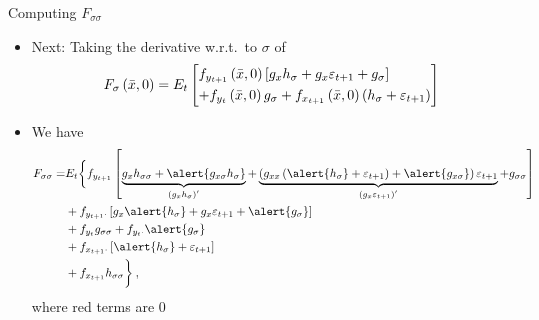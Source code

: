 \begin{frame}{Computing $F_{\sigma\sigma}$}
  \begin{itemize}
    \item Next: Taking the derivative  w.r.t.\ to $\sigma$ of
          \[{F_\sigma }\left( {\bar x,0} \right) = {E_t}\left[ \begin{gathered}
                {f_{{y_{t + 1}}}}\left( {\bar x,0} \right)\left[ {{g_x}{h_\sigma } + {g_x}{\varepsilon _{t + 1}} + {g_\sigma }} \right] \hfill \\
                + {f_{{y_t}}}\left( {\bar x,0} \right){g_\sigma } + {f_{{x_{t + 1}}}}\left( {\bar x,0} \right)\left( {{h_\sigma } + {\varepsilon _{t + 1}}} \right) \hfill \\
              \end{gathered}  \right]\]
    \item We have
          \begin{align}
            {F_{\sigma \sigma }} = & {E_t}\biggl\{ {f_{{y_{t + 1}}}}\left[ {\underbrace { {g_x}{h_{\sigma \sigma }} + \alert{{g_{x\sigma }}{h_\sigma }} }_{\left( {{g_x}{h_\sigma }} \right)'} + \underbrace { {\left( {{g_{xx}}\left( {\alert{h_\sigma } + {\varepsilon _{t + 1}}} \right) + \alert{g_{x\sigma }}} \right){\varepsilon _{t + 1}}} }_{\left( {{g_x}{\varepsilon _{t + 1}}} \right)'} + {g_{\sigma \sigma }}} \right] \notag \\
                                   & + {f_{{y_{t + 1}} \cdot }}\left[ {{g_x}\alert{h_\sigma } + {g_x}{\varepsilon _{t + 1}} + \alert{g_\sigma }} \right] \notag                                                                                                                                                                                                                                                                             \\
                                   & + {f_{{y_t}}}{g_{\sigma \sigma }} + {f_{{y_t} \cdot }}\alert{g_\sigma } \notag                                                                                                                                                                                                                                                                                                                         \\
                                   & + {f_{{x_{t + 1}} \cdot }}\left[ {\alert{h_\sigma } + {\varepsilon _{t + 1}}} \right] \notag                                                                                                                                                                                                                                                                                                           \\
                                   & + {f_{{x_{t + 1}}}}{h_{\sigma \sigma }}\biggr\}  \: ,
          \end{align}
          where red terms are 0
  \end{itemize}
\end{frame}

